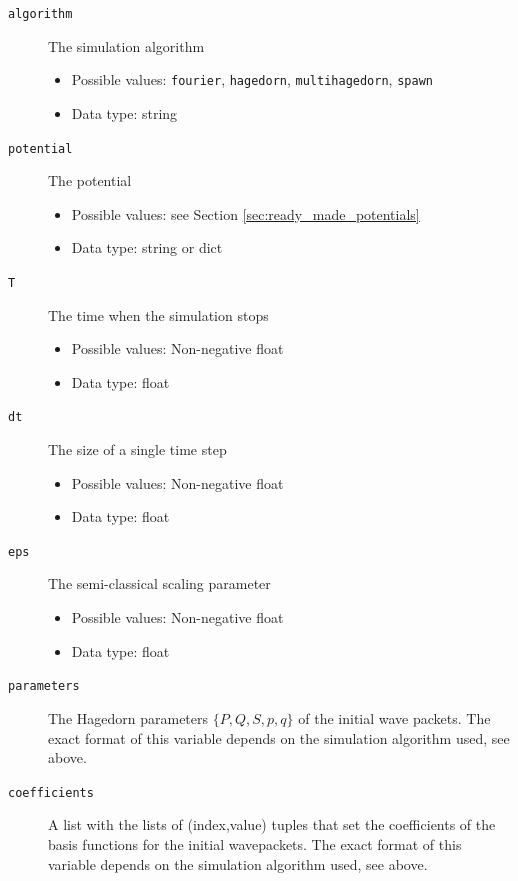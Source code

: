 \documentclass[a4paper,10pt]{report}
\begin{document}
\begin{description}
  \item[\texttt{algorithm}] The simulation algorithm
  \begin{itemize}
    \item Possible values: \texttt{fourier}, \texttt{hagedorn}, \texttt{multihagedorn}, \texttt{spawn}
    \item Data type: string
  \end{itemize}

  \item[\texttt{potential}] The potential
  \begin{itemize}
    \item Possible values: see Section \ref{sec:ready_made_potentials}
    \item Data type: string or dict
  \end{itemize}

  \item[\texttt{T}] The time when the simulation stops
  \begin{itemize}
    \item Possible values: Non-negative float
    \item Data type: float
  \end{itemize}

  \item[\texttt{dt}] The size of a single time step
  \begin{itemize}
    \item Possible values: Non-negative float
    \item Data type: float
  \end{itemize}

  \item[\texttt{eps}] The semi-classical scaling parameter
  \begin{itemize}
    \item Possible values: Non-negative float
    \item Data type: float
  \end{itemize}

  \item[\texttt{parameters}] The Hagedorn parameters $\{P, Q, S, p, q \}$ of the
    initial wave packets. The exact format of this variable depends on the
    simulation algorithm used, see above.

  \item[\texttt{coefficients}] A list with the lists of (index,value) tuples that
    set the coefficients of the basis functions for the initial wavepackets. The
    exact format of this variable depends on the simulation algorithm used, see above.


\end{description}
\end{document}
